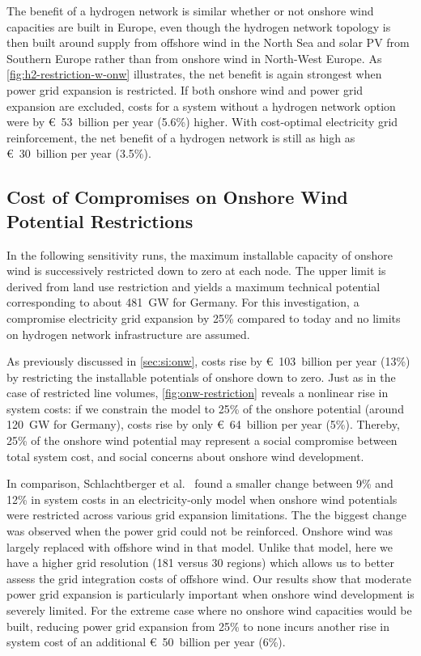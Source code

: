 The benefit of a hydrogen network is similar whether or not onshore wind
capacities are built in Europe, even though the hydrogen network topology is
then built around supply from offshore wind in the North Sea and solar PV from
Southern Europe rather than from onshore wind in North-West Europe. As
\cref{fig:h2-restriction-w-onw} illustrates, the net benefit is again strongest
when power grid expansion is restricted. If both onshore wind and power grid
expansion are excluded, costs for a system without a hydrogen network option
were by \euro~53~billion per year (5.6\%) higher. With cost-optimal electricity
grid reinforcement, the net benefit of a hydrogen network is still as high as
\euro~30~billion per year (3.5\%).

\subsection{Cost of Compromises on Onshore Wind Potential Restrictions}
\label{sec:si:onw-compromise}

In the following sensitivity runs, the maximum installable capacity of onshore
wind is successively restricted down to zero at each node. The upper limit is
derived from land use restriction and yields a maximum technical potential
corresponding to about \SI{481}{\giga\watt} for Germany. For this investigation,
a compromise electricity grid expansion by 25\% compared to today and no limits
on hydrogen network infrastructure are assumed.

As previously discussed in \cref{sec:si:onw}, costs rise by \euro~103~billion
per year (13\%) by restricting the installable potentials of onshore down to
zero. Just as in the case of restricted line volumes, \cref{fig:onw-restriction}
reveals a nonlinear rise in system costs: if we constrain the model to 25\% of
the onshore potential (around 120~GW for Germany), costs rise by only
\euro~64~billion per year (5\%). Thereby, 25\% of the onshore wind potential may
represent a social compromise between total system cost, and social concerns
about onshore wind development.

In comparison, Schlachtberger et al.~ found
a smaller change between 9\% and 12\% in system costs in an electricity-only
model when onshore wind potentials were restricted across various grid expansion
limitations. The the biggest change was observed when the power grid could not
be reinforced. Onshore wind was largely replaced with offshore wind in that
model. Unlike that model, here we have a higher grid resolution (181 versus 30
regions) which allows us to better assess the grid integration costs of offshore
wind. Our results show that moderate power grid expansion is particularly
important when onshore wind development is severely limited. For the extreme
case where no onshore wind capacities would be built, reducing power grid
expansion from 25\% to none incurs another rise in system cost of an additional
\euro~50~billion per year (6\%).


